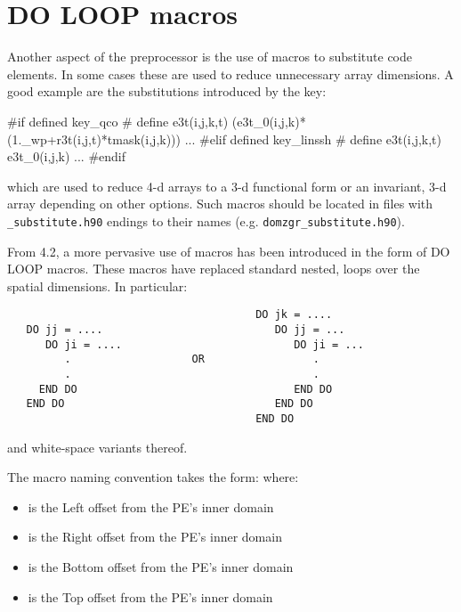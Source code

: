\section{DO LOOP macros}

Another aspect of the preprocessor is the use of macros to substitute code elements. In some cases these are used
to reduce unnecessary array dimensions. A good example are the substitutions introduced by the  key:

\begin{clines}
#if defined key_qco
#   define  e3t(i,j,k,t)   (e3t_0(i,j,k)*(1._wp+r3t(i,j,t)*tmask(i,j,k)))
...
#elif defined key_linssh
#   define  e3t(i,j,k,t)   e3t_0(i,j,k)
...
#endif
\end{clines}

which are used to reduce 4-d arrays to a 3-d functional form or an invariant, 3-d array depending on other
options. Such macros should be located in files with \texttt{\_substitute.h90} endings to their names (e.g. \texttt{domzgr\_substitute.h90}).

From 4.2, a more pervasive use of macros has been introduced in the form of DO LOOP macros. These macros
have replaced standard nested, loops over the spatial dimensions. In particular:

\begin{verbatim}
                                       DO jk = ....
   DO jj = ....                           DO jj = ...
      DO ji = ....                           DO ji = ...
         .                   OR                 .
         .                                      .
     END DO                                  END DO
   END DO                                 END DO
                                       END DO
\end{verbatim}

and white-space variants thereof.

The macro naming convention takes the form:  where:
\begin{itemize}
\item {} is the Left   offset from the PE's inner domain
\item {} is the Right  offset from the PE's inner domain
\item {} is the Bottom offset from the PE's inner domain
\item {} is the Top    offset from the PE's inner domain
\end{itemize}


